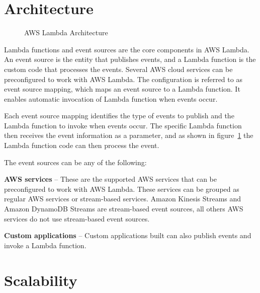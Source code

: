 \documentclass[9pt,twocolumn,twoside]{../../styles/osajnl}
\begin{document}
\section{Architecture}

\begin{figure}[h]
\centering
\graphicspath{ {images/} }
\caption{AWS Lambda Architecture} \cite{www-AWSLambda}
\label{fig:arch}
\end{figure}

Lambda functions and event sources are the core components in AWS Lambda. An 
event source is the entity that publishes events, and a Lambda function is the 
custom code that processes the events. Several AWS cloud services can be 
preconfigured to work with AWS Lambda. The configuration is referred to as 
event source mapping, which maps an event source to a Lambda function. It 
enables automatic invocation of Lambda function when events occur.

Each event source mapping identifies the type of events to publish and the 
Lambda function to invoke when events occur. The specific Lambda function then 
receives the event information as a parameter, and as shown in figure~\ref{fig:arch} the 
Lambda function code can then process the event.

The event sources can be any of the following:

\textbf{AWS services} – These are the supported AWS services that can be 
preconfigured to work with AWS Lambda. These services can be grouped as regular 
AWS services or stream-based services. Amazon Kinesis Streams 
\cite{www-AWSKinesis} and Amazon DynamoDB Streams \cite{www-AWSDynamoStream} 
are stream-based event sources, all others AWS services do not use stream-based 
event sources. 
 
\textbf{Custom applications} – Custom applications built can also publish 
events and invoke a Lambda function.

\section{Scalability}
\end{document}

